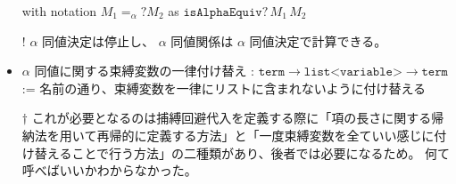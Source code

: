 \documentclass[dvipdfmx]{jsarticle}
\begin{document}
\begin{itemize}
    with notation \(M_1 =_{\alpha}? M_2\) as \(\texttt{isAlphaEquiv?} \, M_1 \, M_2\)
  \item[!] \(\alpha\) 同値決定は停止し、 \(\alpha\) 同値関係は \(\alpha\) 同値決定で計算できる。
  \item \(\alpha\) 同値に関する束縛変数の一律付け替え : \(\texttt{term} \to \texttt{list<variable>} \to \texttt{term}\) \\
    := 名前の通り、束縛変数を一律にリストに含まれないように付け替える
  \item[\(\dagger\)]これが必要となるのは捕縛回避代入を定義する際に「項の長さに関する帰納法を用いて再帰的に定義する方法」と「一度束縛変数を全ていい感じに付け替えることで行う方法」の二種類があり、後者では必要になるため。
    何て呼べばいいかわからなかった。
\end{itemize}
\end{document}
